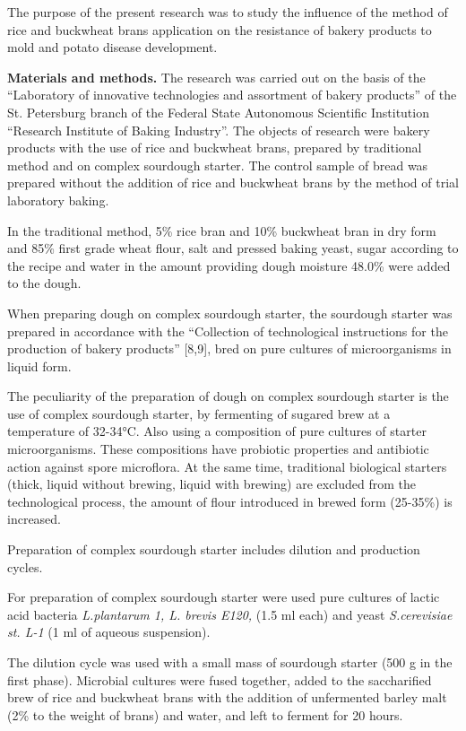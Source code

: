 The purpose of the present research was to study the influence of the
method of rice and buckwheat brans application on the resistance of
bakery products to mold and potato disease development.

{\bfseries Materials and methods.} The research was carried out on the
basis of the ``Laboratory of innovative technologies and assortment of
bakery products'' of the St. Petersburg branch of the Federal State
Autonomous Scientific Institution ``Research Institute of Baking
Industry''. The objects of research were bakery products with the use of
rice and buckwheat brans, prepared by traditional method and on complex
sourdough starter. The control sample of bread was prepared without the
addition of rice and buckwheat brans by the method of trial laboratory
baking.

In the traditional method, 5\% rice bran and 10\% buckwheat bran in dry
form and 85\% first grade wheat flour, salt and pressed baking yeast,
sugar according to the recipe and water in the amount providing dough
moisture 48.0\% were added to the dough.

When preparing dough on complex sourdough starter, the sourdough starter
was prepared in accordance with the ``Collection of technological
instructions for the production of bakery products'' {[}8,9{]}, bred on
pure cultures of microorganisms in liquid form.

The peculiarity of the preparation of dough on complex sourdough starter
is the use of complex sourdough starter, by fermenting of sugared brew
at a temperature of 32-34°C. Also using a composition of pure cultures
of starter microorganisms. These compositions have probiotic properties
and antibiotic action against spore microflora. At the same time,
traditional biological starters (thick, liquid without brewing, liquid
with brewing) are excluded from the technological process, the amount of
flour introduced in brewed form (25-35\%) is increased.

Preparation of complex sourdough starter includes dilution and
production cycles.

For preparation of complex sourdough starter were used pure cultures of
lactic acid bacteria \emph{L.plantarum 1, L. brevis E120,} (1.5 ml each)
and yeast \emph{S.cerevisiae st. L-1} (1 ml of aqueous suspension).

The dilution cycle was used with a small mass of sourdough starter (500
g in the first phase). Microbial cultures were fused together, added to
the saccharified brew of rice and buckwheat brans with the addition of
unfermented barley malt (2\% to the weight of brans) and water, and left
to ferment for 20 hours.

